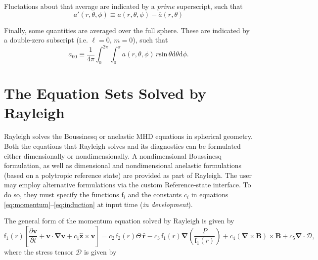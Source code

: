 \documentclass[10pt,letterpaper]{article}
\newcommand{\ff}{\mathrm{f}}
\begin{document}

Fluctations about that average are indicated by a \textit{prime} superscript, such that
\begin{equation}
    \label{eq:prime}
    a'(r,\theta,\phi)\equiv a(r,\theta,\phi)-\overline{a}(r,\theta)
\end{equation}

Finally, some quantities are averaged over the full sphere.  These are indicated by a double-zero subscript (i.e. $\ell=0,\,m=0$), such that
\begin{equation}
\label{eq:fullsph}
a_{00}\equiv \frac{1}{4\pi}\int_{0}^{2\pi}\int_{0}^{\pi} a(r,\theta,\phi)\, r\mathrm{sin}\,\theta\mathrm{d}\theta\mathrm{d}\phi.
\end{equation}


\section{The Equation Sets Solved by Rayleigh}
Rayleigh solves the Boussinesq or anelastic MHD equations in spherical geometry.  Both the equations that Rayleigh solves and its diagnostics can be formulated either dimensionally or nondimensionally.  A nondimensional Boussinesq formulation, as well as dimensional and nondimensional anelastic formulations (based on a polytropic reference state) are provided as part of Rayleigh.  The user may employ alternative formulations via the custom Reference-state interface.  To do so, they must specify the functions $\ff_i$ and the constants $c_i$ in equations \ref{eq:momentum}--\ref{eq:induction} at input time (\textit{in development}).   

The general form of the momentum equation solved by Rayleigh is given by
\begin{equation}
    \label{eq:momentum}
    \ff_1(r)\left[\frac{\partial \boldsymbol{v}}{\partial t}  + \boldsymbol{v}\cdot\boldsymbol{\nabla}\boldsymbol{v}  %
     + c_1\boldsymbol{\hat{z}}\times\boldsymbol{v} \right]  = %
    c_2\,\ff_2(r)\Theta\,\boldsymbol{\hat{r}} %
     - c_3\,\ff_1(r)\boldsymbol{\nabla}\left(\frac{P}{\ff_1(r)}\right) %
     + c_4\left(\boldsymbol{\nabla}\times\boldsymbol{B}\right)\times\boldsymbol{B} %
     + c_5\boldsymbol{\nabla}\cdot\boldsymbol{\mathcal{D}},
\end{equation}
where the stress tensor $\mathcal{D}$ is given by
\end{document}
